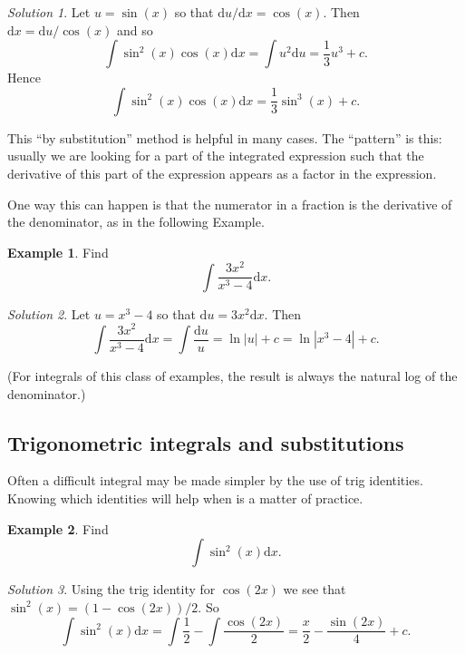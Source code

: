 \documentclass[
  11pt,
  oneside]{book}
\newcommand{\slide}{}
\newcommand{\cpybx}{}
\newcommand{\ecpybx}{}
\theoremstyle{definition}
\theoremstyle{definition}
\newtheorem{example}{Example}[chapter]
\theoremstyle{definition}
\theoremstyle{definition}
\theoremstyle{remark}
\newtheorem*{solution}{Solution}
\begin{document}
\begin{solution}
Let \(u = \sin(x)\) so that \(\mathrm{d}u/\mathrm{d}x = \cos(x)\). Then \(\mathrm{d}x = \mathrm{d}u/\cos(x)\) and so
\[
\int\sin^2(x)\cos(x)\mathrm{d}x = \int u^2\mathrm{d}u = \frac 13u^3+c.
\]
Hence
\[
\int\sin^2(x)\cos(x)\mathrm{d}x = \frac 13\sin^3(x) + c.
\]
\end{solution}

\slide

This ``by substitution'' method is helpful in many cases. The ``pattern'' is this: usually we are looking for a part of the integrated expression such that the derivative of this part of the expression appears as a factor in the expression.

One way this can happen is that the numerator in a fraction is the derivative of the denominator, as in the following Example.

\cpybx

\begin{example}
Find
\[
\int\frac{3x^2}{x^3-4}\mathrm{d}x.
\]
\end{example}

\ecpybx\slide\copy\copybox

\begin{solution}
Let \(u = x^3-4\) so that \(\mathrm{d}u = 3x^2\mathrm{d}x\). Then
\[
\int\frac{3x^2}{x^3-4}\mathrm{d}x = \int \frac{\mathrm{d}u}{u} = \ln|u|+c = \ln|x^3-4|+c.
\]
\end{solution}

(For integrals of this class of examples, the result is always the natural log of the denominator.)
\slide

\subsection{Trigonometric integrals and substitutions}\label{trigonometric-integrals-and-substitutions}

Often a difficult integral may be made simpler by the use of trig identities. Knowing which identities will help when is a matter of practice.

\begin{example}
Find
\[
\int\sin^2(x) \mathrm{d}x.
\]
\end{example}

\begin{solution}
Using the trig identity for \(\cos(2x)\) we see that \(\sin^2(x) = (1-\cos(2x))/2\). So
\[
\int\sin^2(x) \mathrm{d}x = \int\frac 12-\int\frac{\cos(2x)}{2} = \frac x2-\frac{\sin(2x)}{4}+c.
\]
\end{solution}
\end{document}
